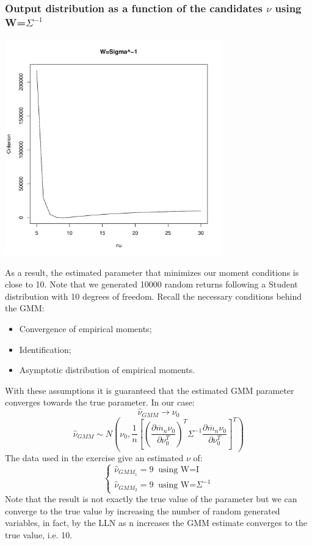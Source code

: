 \subsubsection{Output distribution as a function of the candidates $\nu$ using W=$\Sigma^{-1}$}
\begin{center}
    \includegraphics[width=0.7\textwidth]{Graph2_1.pdf}    
\end{center}

\newpage
As a result, the estimated parameter that minimizes our moment conditions is close to 10. Note that we generated 10000 random returns following a Student distribution with 10 degrees of freedom. Recall the necessary conditions behind the GMM:
\begin{itemize}
    \item Convergence of empirical moments;
    \item Identification;
    \item Asymptotic distribution of empirical moments.
\end{itemize}
With these assumptions it is guaranteed that the estimated GMM parameter converges towards the true parameter. In our case:
\begin{equation*}
        \widehat{\nu}_{GMM} \to \nu_0
\end{equation*}
\begin{equation*}
        \widehat{\nu}_{GMM} \sim N(\nu_0,
        \frac{1}{n}[(\frac{\partial\overline{m}_n\nu_0}{\partial\nu_0^T})^T\Sigma^{-1}\frac{\partial\overline{m}_n\nu_0}{\partial\nu_0^T}]^T)
\end{equation*}
The data used in the exercise give an estimated $\nu$ of:
\begin{equation*}
    \begin{cases}
    \widehat{\nu}_{GMM_{1}}=9 \;\;\text{using W=I}\\
    \widehat{\nu}_{GMM_{2}}=9 \;\;\text{using W=}\Sigma^{-1}
\end{cases}
\end{equation*}
Note that the result is not exactly the true value of the parameter but we can converge to the true value by increasing the number of random generated variables, in fact, by the LLN as n increases the GMM estimate converges to the true value, i.e. 10.